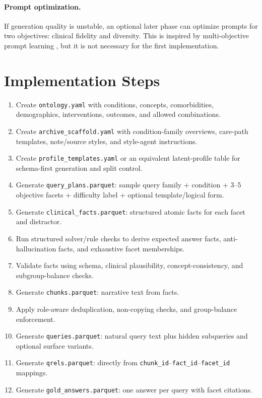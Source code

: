 \documentclass[11pt,a4paper]{article}
\newcommand{\field}[1]{\texttt{#1}}
\begin{document}
\paragraph{Prompt optimization.}
If generation quality is unstable, an optional later phase can optimize prompts for two objectives: clinical fidelity and diversity. This is inspired by multi-objective prompt learning \citep{pastrian2026evolutionary}, but it is not necessary for the first implementation.

\section{Implementation Steps}

\begin{enumerate}[leftmargin=*]
	\item Create \field{ontology.yaml} with conditions, concepts, comorbidities, demographics, interventions, outcomes, and allowed combinations.
	\item Create \field{archive\_scaffold.yaml} with condition-family overviews, care-path templates, note/source styles, and style-agent instructions.
	\item Create \field{profile\_templates.yaml} or an equivalent latent-profile table for schema-first generation and split control.
	\item Generate \field{query\_plans.parquet}: sample query family + condition + 3--5 objective facets + difficulty label + optional template/logical form.
	\item Generate \field{clinical\_facts.parquet}: structured atomic facts for each facet and distractor.
	\item Run structured solver/rule checks to derive expected answer facts, anti-hallucination facts, and exhaustive facet memberships.
	\item Validate facts using schema, clinical plausibility, concept-consistency, and subgroup-balance checks.
	\item Generate \field{chunks.parquet}: narrative text from facts.
	\item Apply role-aware deduplication, non-copying checks, and group-balance enforcement.
	\item Generate \field{queries.parquet}: natural query text plus hidden subqueries and optional surface variants.
	\item Generate \field{qrels.parquet}: directly from \field{chunk\_id}--\field{fact\_id}--\field{facet\_id} mappings.
	\item Generate \field{gold\_answers.parquet}: one answer per query with facet citations.

\end{enumerate}
\end{document}
